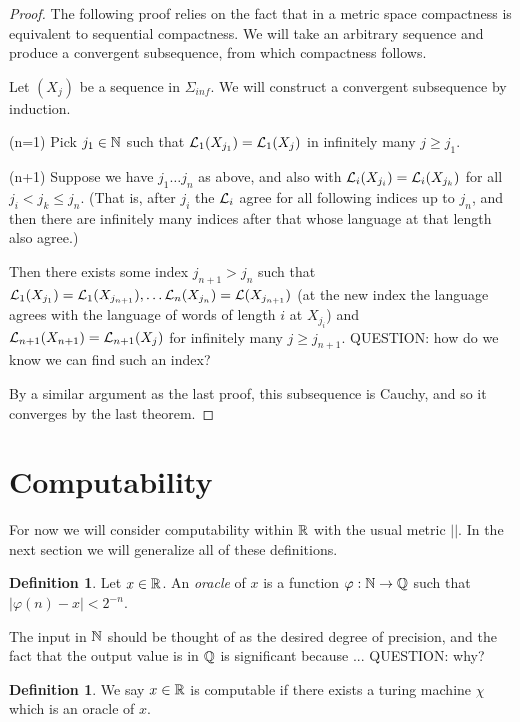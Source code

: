 \documentclass[11pt, reqno]{amsart}
\theoremstyle{plain}
\theoremstyle{definition}
\newtheorem{defn}[thm]{Definition}
\begin{document}
\begin{proof}
    The following proof relies on the fact that in a metric space compactness is equivalent to sequential compactness. We will take an arbitrary sequence and produce a convergent subsequence, from which compactness follows. 

    Let $(X_j)$ be a sequence in $\Sigma_{inf}$. We will construct a convergent subsequence by induction. 

    (n=1) Pick $j_1 \in \mathbb{N}$ such that $\mathcal{L}_1(X_{j_1}) = \mathcal{L}_1(X_j)$ in infinitely many $j \geq j_1$.
    
    (n+1) Suppose we have $j_1 \dots j_n$ as above, and also with $\mathcal{L}_i(X_{j_i}) = \mathcal{L}_i(X_{j_k})$ for all $j_i < j_k \leq j_n$. (That is, after $j_i$ the $\mathcal{L}_i$ agree for all following indices up to $j_n$, and then there are infinitely many indices after that whose language at that length also agree.)

    Then there exists some index $j_{n+1} > j_n$ such that $\mathcal{L}_1(X_{j_1}) = \mathcal{L}_1(X_{j_{n+1}}), \dots \mathcal{L}_n(X_{j_n}) = \mathcal{L}(X_{j_{n+1}})$ (at the new index the language agrees with the language of words of length $i$ at $X_{j_i}$) and $\mathcal{L}_{n+1}(X_{n+1}) = \mathcal{L}_{n+1}(X_j)$ for infinitely many $j \geq j_{n+1}$.
    QUESTION: how do we know we can find such an index?

    By a similar argument as the last proof, this subsequence is Cauchy, and so it converges by the last theorem. 
\end{proof}


\section{Computability}
For now we will consider computability within $\mathbb{R}$ with the usual metric $||$. In the next section we will generalize all of these definitions. 

\begin{defn}
    Let $x \in \mathbb{R}$. An \textit{oracle} of $x$ is a function $\varphi: \mathbb{N} \rightarrow \mathbb{Q}$ such that $|\varphi(n) - x|< 2^{-n}$. 
\end{defn}

The input in $\mathbb{N}$ should be thought of as the desired degree of precision, and the fact that the output value is in $\mathbb{Q}$ is significant because ... QUESTION: why?

\begin{defn}
    We say $x \in \mathbb{R}$ is computable if there exists a turing machine $\chi$ which is an oracle of $x$. 
\end{defn}
\end{document}
